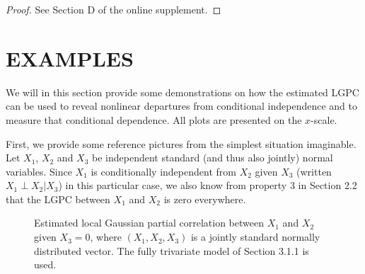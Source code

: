 \documentclass[
  12pt,
  letterpaper]{article}
\theoremstyle{definition}
\theoremstyle{definition}
\theoremstyle{definition}
\theoremstyle{remark}
\begin{document}
\begin{proof}
{}See Section D of the online supplement.
\end{proof}

\hypertarget{chap:example}{%
\section{EXAMPLES}\label{chap:example}}

We will in this section provide some demonstrations on how the estimated LGPC can be used to reveal nonlinear departures from conditional independence and to measure that conditional dependence. All plots are presented on the \(x\)-scale.

First, we provide some reference pictures from the simplest situation imaginable. Let \(X_1\), \(X_2\) and \(X_3\) be independent standard (and thus also jointly) normal variables. Since \(X_1\) is conditionally independent from \(X_2\) given \(X_3\) (written \(X_1 \perp X_2 | X_3\)) in this particular case, we also know from property 3 in Section 2.2 that the LGPC between \(X_1\) and \(X_2\) is zero everywhere.

\begin{figure}
    \caption{Estimated local Gaussian partial correlation between $X_1$ and $X_2$ given $X_3 = 0$, where $(X_1, X_2, X_3)$ is a jointly standard normally distributed vector. The fully trivariate model of Section 3.1.1 is used.}\label{fig:gaussian-example-plots}
\end{figure}
\end{document}
